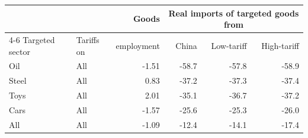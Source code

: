 \begin{tabular}{llrrrr}
\toprule
 & & Goods & \multicolumn{3}{c}{Real imports of targeted goods from} \\
\cmidrule(lr){4-6}
Targeted sector & Tariffs on & employment & China & Low-tariff & High-tariff \\
\midrule
Oil & All & -1.51 & -58.7 & -57.8 & -58.9 \\
\midrule
Steel & All & 0.83 & -37.2 & -37.3 & -37.4 \\
\midrule
Toys & All & 2.01 & -35.1 & -36.7 & -37.2 \\
\midrule
Cars & All & -1.57 & -25.6 & -25.3 & -26.0 \\
\midrule
All & All & -1.09 & -12.4 & -14.1 & -17.4 \\
\bottomrule
\end{tabular}
